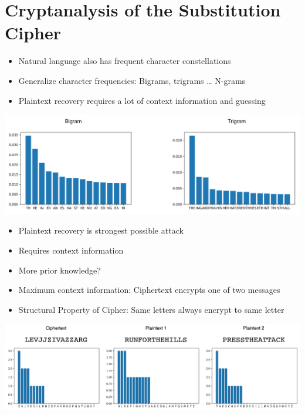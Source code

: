 	\section{Cryptanalysis of the Substitution Cipher}
		\begin{itemize}
			\item Natural language also has frequent character constellations
			\item Generalize character frequencies: Bigrams, trigrams … N-grams
			\item Plaintext recovery requires a lot of context information and guessing
		\end{itemize}
		\begin{center}
         	 \includegraphics[width=160mm]{Graphics/Historical Ciphers/CryptanalysisSubstitutionCipher1.png}
       \end{center}
       \begin{itemize}
       	\item Plaintext recovery is strongest possible attack
       	\item Requires context information
       	\item More prior knowledge?
       	\item Maximum context information: Ciphertext encrypts one of two messages
       	\item Structural Property of Cipher: Same letters always encrypt to same letter
       \end{itemize}
       \begin{center}
         	 \includegraphics[width=160mm]{Graphics/Historical Ciphers/CryptanalysisSubstitutionCipher2.png}\newline
       \end{center}
    
